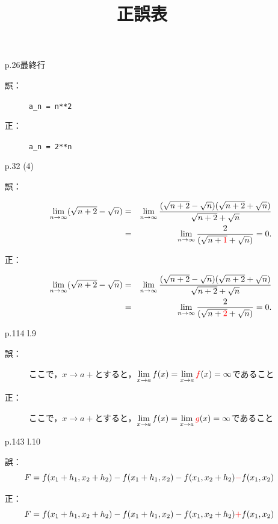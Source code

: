 \documentclass[pdflatex,ja=standard,a4paper]{bxjsarticle}
\title{正誤表}
\author{}
\begin{document}
\maketitle


\begin{enumerate}
\item[p.26最終行]\quad
\begin{description}
	\item[誤：] 
	\verb|a_n = n**2|
	\item[正：]
	\verb|a_n = 2**n|
\end{description}
\item[p.32 (4)]\quad 
\begin{description}
\item[誤：] 
\begin{eqnarray*}
			\lim_{n\to\infty}(\sqrt{n+2}-\sqrt{n})
			&=& \lim_{n\to\infty}
			\frac{(\sqrt{n+2}-\sqrt{n})(\sqrt{n+2}+\sqrt{n})}{\sqrt{n+2}+\sqrt{n}}\\
			&=& \lim_{n\to\infty}
			\frac{2}{(\sqrt{n+\textcolor{red}{1}}+\sqrt{n})}=0.
\end{eqnarray*}
\item[正：] 
\begin{eqnarray*}
			\lim_{n\to\infty}(\sqrt{n+2}-\sqrt{n})
			&=& \lim_{n\to\infty}
			\frac{(\sqrt{n+2}-\sqrt{n})(\sqrt{n+2}+\sqrt{n})}{\sqrt{n+2}+\sqrt{n}}\\
		&=& \lim_{n\to\infty}
		\frac{2}{(\sqrt{n+\textcolor{red}{2}}+\sqrt{n})}=0.
\end{eqnarray*}
\end{description}
\item[p.114 l.9]\quad 
\begin{description}
\item[誤：] 
ここで，$x\to a+$とすると，${\displaystyle\lim_{x\to a}f(x)=\lim_{x\to a}\textcolor{red}{f}(x)=\infty}$であること
\item[正：] 
ここで，$x\to a+$とすると，${\displaystyle\lim_{x\to a}f(x)=\lim_{x\to a}\textcolor{red}{g}(x)=\infty}$であること
\end{description}
\item[p.143 l.10]
\item[誤：] 
$$F=f(x_1+h_1,x_2+h_2)-f(x_1+h_1,x_2)-f(x_1,x_2+h_2)\textcolor{red}{-}f(x_1,x_2)$$
\item[正：] 
$$F=f(x_1+h_1,x_2+h_2)-f(x_1+h_1,x_2)-f(x_1,x_2+h_2)\textcolor{red}{+}f(x_1,x_2)$$


\end{enumerate}
\end{document}
